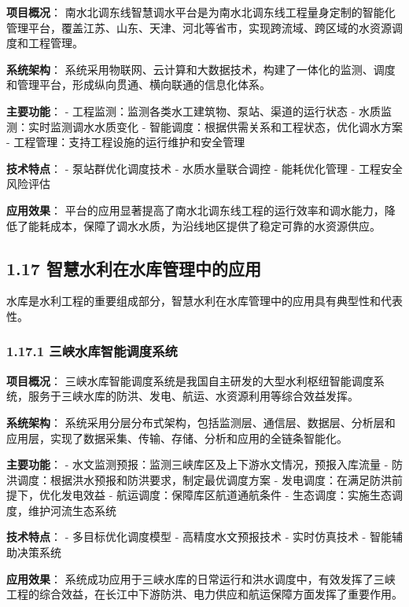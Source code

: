 \textbf{项目概况}：
南水北调东线智慧调水平台是为南水北调东线工程量身定制的智能化管理平台，覆盖江苏、山东、天津、河北等省市，实现跨流域、跨区域的水资源调度和工程管理。

\textbf{系统架构}：
系统采用物联网、云计算和大数据技术，构建了一体化的监测、调度和管理平台，形成纵向贯通、横向联通的信息化体系。

\textbf{主要功能}： - 工程监测：监测各类水工建筑物、泵站、渠道的运行状态
- 水质监测：实时监测调水水质变化 -
智能调度：根据供需关系和工程状态，优化调水方案 -
工程管理：支持工程设施的运行维护和安全管理

\textbf{技术特点}： - 泵站群优化调度技术 - 水质水量联合调控 -
能耗优化管理 - 工程安全风险评估

\textbf{应用效果}：
平台的应用显著提高了南水北调东线工程的运行效率和调水能力，降低了能耗成本，保障了调水水质，为沿线地区提供了稳定可靠的水资源供应。

\subsection{1.17
智慧水利在水库管理中的应用}\label{ux667aux6167ux6c34ux5229ux5728ux6c34ux5e93ux7ba1ux7406ux4e2dux7684ux5e94ux7528}

水库是水利工程的重要组成部分，智慧水利在水库管理中的应用具有典型性和代表性。

\subsubsection{1.17.1
三峡水库智能调度系统}\label{ux4e09ux5ce1ux6c34ux5e93ux667aux80fdux8c03ux5ea6ux7cfbux7edf}

\textbf{项目概况}：
三峡水库智能调度系统是我国自主研发的大型水利枢纽智能调度系统，服务于三峡水库的防洪、发电、航运、水资源利用等综合效益发挥。

\textbf{系统架构}：
系统采用分层分布式架构，包括监测层、通信层、数据层、分析层和应用层，实现了数据采集、传输、存储、分析和应用的全链条智能化。

\textbf{主要功能}： -
水文监测预报：监测三峡库区及上下游水文情况，预报入库流量 -
防洪调度：根据洪水预报和防洪要求，制定最优调度方案 -
发电调度：在满足防洪前提下，优化发电效益 -
航运调度：保障库区航道通航条件 -
生态调度：实施生态调度，维护河流生态系统

\textbf{技术特点}： - 多目标优化调度模型 - 高精度水文预报技术 -
实时仿真技术 - 智能辅助决策系统

\textbf{应用效果}：
系统成功应用于三峡水库的日常运行和洪水调度中，有效发挥了三峡工程的综合效益，在长江中下游防洪、电力供应和航运保障方面发挥了重要作用。

